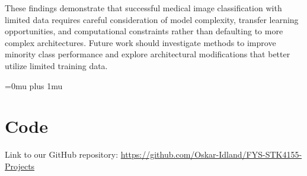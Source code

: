 \documentclass[aps,pra,english,notitlepage,reprint,nofootinbib]{revtex4-1}  %
\begin{document}
These findings demonstrate that successful medical image classification with limited data requires careful consideration of model complexity, transfer learning opportunities, and computational constraints rather than defaulting to more complex architectures. Future work should investigate methods to improve minority class performance and explore architectural modifications that better utilize limited training data.

\Urlmuskip=0mu plus 1mu\relax
\onecolumngrid


\newpage
\appendix
\section{Code}\label{appsec:code}
Link to our GitHub repository: \href{https://github.com/Oskar-Idland/FYS-STK4155-Projects}{https://github.com/Oskar-Idland/FYS-STK4155-Projects}
\end{document}
